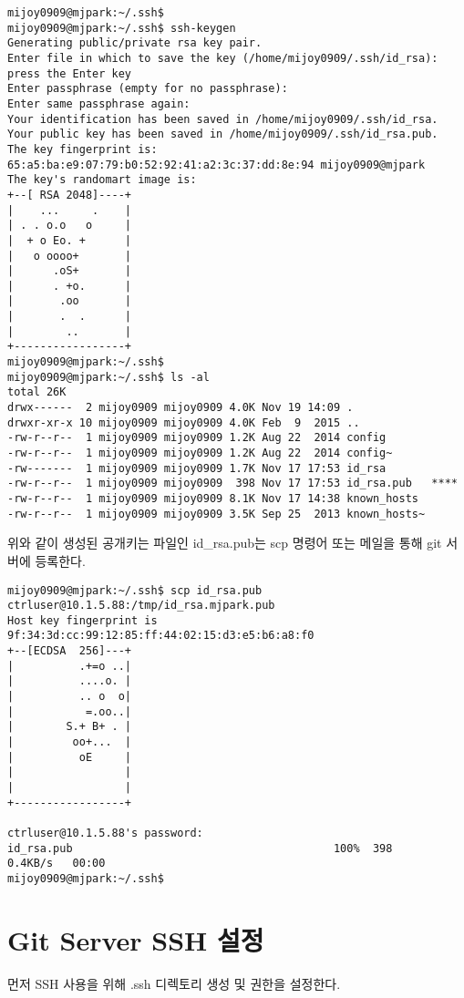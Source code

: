\documentclass[11pt
  , a4paper
  , article
  , oneside
]{memoir}
\begin{document}
\scriptsize
{
\begin{verbatim}
mijoy0909@mjpark:~/.ssh$ 
mijoy0909@mjpark:~/.ssh$ ssh-keygen
Generating public/private rsa key pair.
Enter file in which to save the key (/home/mijoy0909/.ssh/id_rsa): press the Enter key
Enter passphrase (empty for no passphrase):
Enter same passphrase again: 
Your identification has been saved in /home/mijoy0909/.ssh/id_rsa.
Your public key has been saved in /home/mijoy0909/.ssh/id_rsa.pub.
The key fingerprint is:
65:a5:ba:e9:07:79:b0:52:92:41:a2:3c:37:dd:8e:94 mijoy0909@mjpark
The key's randomart image is:
+--[ RSA 2048]----+
|    ...     .    |
| . . o.o   o     |
|  + o Eo. +      |
|   o oooo+       |
|      .oS+       |
|      . +o.      |
|       .oo       |
|       .  .      |
|        ..       |
+-----------------+
mijoy0909@mjpark:~/.ssh$
mijoy0909@mjpark:~/.ssh$ ls -al
total 26K
drwx------  2 mijoy0909 mijoy0909 4.0K Nov 19 14:09 .
drwxr-xr-x 10 mijoy0909 mijoy0909 4.0K Feb  9  2015 ..
-rw-r--r--  1 mijoy0909 mijoy0909 1.2K Aug 22  2014 config
-rw-r--r--  1 mijoy0909 mijoy0909 1.2K Aug 22  2014 config~
-rw-------  1 mijoy0909 mijoy0909 1.7K Nov 17 17:53 id_rsa
-rw-r--r--  1 mijoy0909 mijoy0909  398 Nov 17 17:53 id_rsa.pub   ****
-rw-r--r--  1 mijoy0909 mijoy0909 8.1K Nov 17 14:38 known_hosts
-rw-r--r--  1 mijoy0909 mijoy0909 3.5K Sep 25  2013 known_hosts~
\end{verbatim}
}

위와 같이 생성된 공개키는 파일인 id\_rsa.pub는 scp 명령어 또는 메일을 통해 git 서버에 등록한다. 

\scriptsize
{
\begin{verbatim}
mijoy0909@mjpark:~/.ssh$ scp id_rsa.pub ctrluser@10.1.5.88:/tmp/id_rsa.mjpark.pub
Host key fingerprint is 9f:34:3d:cc:99:12:85:ff:44:02:15:d3:e5:b6:a8:f0
+--[ECDSA  256]---+
|          .+=o ..|
|          ....o. |
|          .. o  o|
|           =.oo..|
|        S.+ B+ . |
|         oo+...  |
|          oE     |
|                 |
|                 |
+-----------------+

ctrluser@10.1.5.88's password: 
id_rsa.pub                                        100%  398     0.4KB/s   00:00    
mijoy0909@mjpark:~/.ssh$ 
\end{verbatim}
}


\section{Git Server SSH 설정}
먼저 SSH 사용을 위해 .ssh 디렉토리 생성 및 권한을 설정한다.
\end{document}
